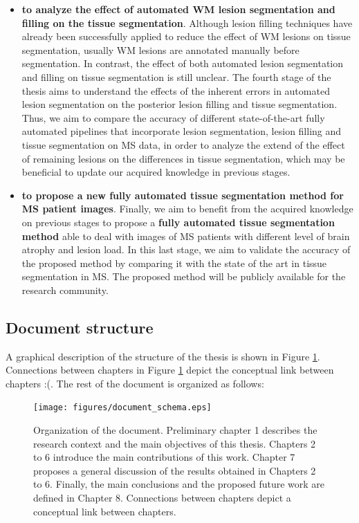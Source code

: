 \begin{itemize}
\item \textbf{to analyze the effect of automated WM lesion segmentation and filling on the tissue segmentation}. Although lesion filling techniques have already been successfully applied to reduce the effect of WM lesions on tissue segmentation, usually WM lesions are annotated manually before segmentation. In contrast, the effect of both automated lesion segmentation and filling on tissue segmentation is still unclear. The fourth stage of the thesis aims to understand the effects of the inherent errors in automated lesion segmentation on the posterior lesion filling and tissue segmentation. Thus, we aim to compare the accuracy of different state-of-the-art fully automated pipelines that incorporate lesion segmentation, lesion filling and tissue segmentation on MS data, in order to analyze the extend of the effect of remaining lesions on the differences in tissue segmentation, which may be beneficial to update our acquired knowledge in previous stages. 

\item \textbf{to propose a new fully automated tissue segmentation method for MS patient images}. Finally, we aim to benefit from the acquired knowledge on previous stages to propose a \textbf{fully automated tissue segmentation method} able to deal with images of MS patients with different level of brain atrophy and lesion load. In this last stage, we aim to validate the accuracy of the proposed method by comparing it with the state of the art in tissue segmentation in MS. The proposed method will be publicly available for the research community. 

 \end{itemize}


\subsection{Document structure}
\label{sec:label}

A graphical description of the structure of the thesis is shown in Figure \ref{document_structure}. Connections between chapters in Figure \ref{document_structure} depict the conceptual link between chapters :(. The rest of the document is organized as follows:

\begin{figure}[top]
  \begin{center}
    \texttt{[image: figures/document\_schema.eps]}
  \end{center}
    \caption{Organization of the document. Preliminary chapter 1 describes the research context and the main objectives of this thesis. Chapters 2 to 6 introduce the main contributions of this work. Chapter 7 proposes a general discussion of the results obtained in Chapters 2 to 6. Finally, the main conclusions and the proposed future work are defined in Chapter 8. Connections between chapters depict a conceptual link between chapters.}
    \label{document_structure}
\end{figure}


